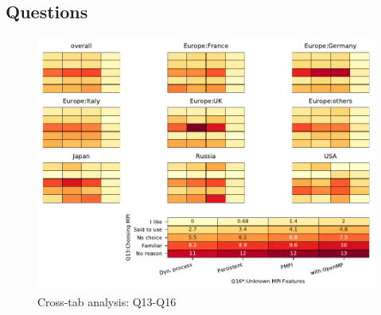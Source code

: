 
\subsection{Questions}


\begin{figure}
\begin{center}
\includegraphics[width=12cm]{../pdfs/Q13-Q16.pdf}
\caption{Cross-tab analysis: Q13-Q16}
\label{fig:Q13-Q16}
\end{center}
\end{figure}
